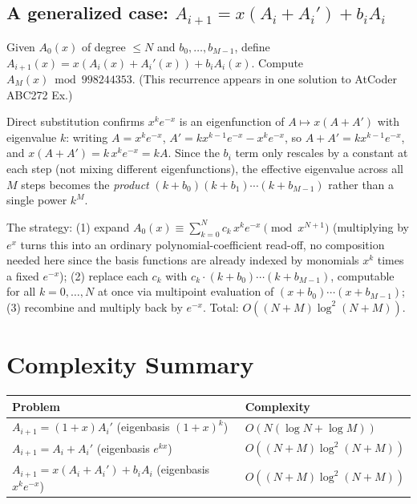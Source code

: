 \documentclass[11pt]{article}
\begin{document}
\subsection{A generalized case: \texorpdfstring{$A_{i+1}=x(A_i+A_i')+b_iA_i$}{A\_{i+1}=x(A\_i+A\_i')+b\_i A\_i}}
\begin{definitionbox}
Given $A_0(x)$ of degree $\le N$ and $b_0,\ldots,b_{M-1}$, define
$A_{i+1}(x) = x(A_i(x)+A_i'(x)) + b_i A_i(x)$. Compute $A_M(x) \bmod
998244353$. (This recurrence appears in one solution to AtCoder ABC272
Ex.)
\end{definitionbox}

Direct substitution confirms $x^k e^{-x}$ is an eigenfunction of
$A \mapsto x(A+A')$ with eigenvalue $k$: writing $A = x^k e^{-x}$,
$A' = kx^{k-1}e^{-x} - x^k e^{-x}$, so
$A + A' = kx^{k-1}e^{-x}$, and $x(A+A') = k\,x^k e^{-x} = kA$.
Since the $b_i$ term only rescales by a constant at each step (not mixing
different eigenfunctions), the effective eigenvalue across all $M$ steps
becomes the \emph{product} $(k+b_0)(k+b_1)\cdots(k+b_{M-1})$ rather than a
single power $k^M$.

\begin{theorembox}
The strategy: (1) expand $A_0(x) \equiv \sum_{k=0}^N c_k\, x^k e^{-x}
\pmod{x^{N+1}}$ (multiplying by $e^x$ turns this into an ordinary
polynomial-coefficient read-off, no composition needed here since the
basis functions are already indexed by monomials $x^k$ times a fixed
$e^{-x}$); (2) replace each $c_k$ with $c_k \cdot (k+b_0)\cdots
(k+b_{M-1})$, computable for all $k=0,\ldots,N$ at once via multipoint
evaluation of $(x+b_0)\cdots(x+b_{M-1})$; (3) recombine and multiply back
by $e^{-x}$. Total: $O((N+M)\log^2(N+M))$.
\end{theorembox}

\section{Complexity Summary}
\begin{center}
\begin{tabular}{ll}
\toprule
\textbf{Problem} & \textbf{Complexity} \\
\midrule
$A_{i+1}=(1+x)A_i'$ (eigenbasis $(1+x)^k$) & $O(N(\log N + \log M))$ \\
$A_{i+1}=A_i+A_i'$ (eigenbasis $e^{kx}$) & $O((N+M)\log^2(N+M))$ \\
$A_{i+1}=x(A_i+A_i')+b_iA_i$ (eigenbasis $x^ke^{-x}$) & $O((N+M)\log^2(N+M))$ \\
\bottomrule
\end{tabular}
\end{center}
\end{document}
